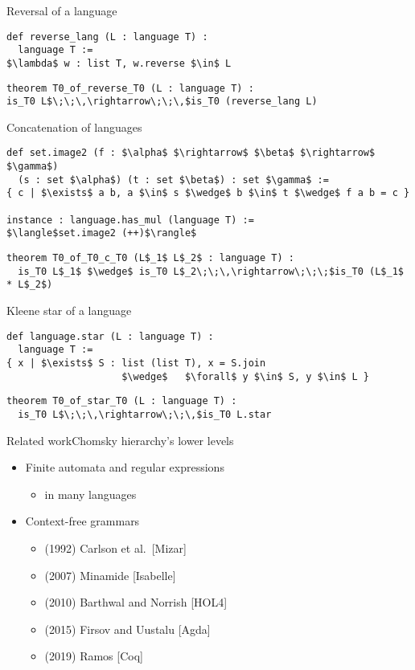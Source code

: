 \documentclass{beamer}
\begin{document}
	\begin{frame}[fragile]{Reversal of a language}
\begin{lstlisting}
def reverse_lang (L : language T) :
  language T :=
$\lambda$ w : list T, w.reverse $\in$ L
\end{lstlisting}
\pause
\begin{lstlisting}
theorem T0_of_reverse_T0 (L : language T) :
is_T0 L$\;\;\,\rightarrow\;\;\,$is_T0 (reverse_lang L)
\end{lstlisting}
	\end{frame}
	
	\begin{frame}[fragile]{Concatenation of languages}
\begin{lstlisting}
def set.image2 (f : $\alpha$ $\rightarrow$ $\beta$ $\rightarrow$ $\gamma$)
  (s : set $\alpha$) (t : set $\beta$) : set $\gamma$ :=
{ c | $\exists$ a b, a $\in$ s $\wedge$ b $\in$ t $\wedge$ f a b = c }

instance : language.has_mul (language T) :=
$\langle$set.image2 (++)$\rangle$
\end{lstlisting}
\pause
\begin{lstlisting}
theorem T0_of_T0_c_T0 (L$_1$ L$_2$ : language T) :
  is_T0 L$_1$ $\wedge$ is_T0 L$_2\;\;\,\rightarrow\;\;\;$is_T0 (L$_1$ * L$_2$)
\end{lstlisting}
	\end{frame}
	
	\begin{frame}[fragile]{Kleene star of a language}
\begin{lstlisting}
def language.star (L : language T) :
  language T :=
{ x | $\exists$ S : list (list T), x = S.join
                    $\wedge$   $\forall$ y $\in$ S, y $\in$ L }
\end{lstlisting}
\pause
\begin{lstlisting}
theorem T0_of_star_T0 (L : language T) :
  is_T0 L$\;\;\,\rightarrow\;\;\,$is_T0 L.star
\end{lstlisting}
	\end{frame}
	
	\begin{frame}{Related work}{Chomsky hierarchy's lower levels}
		\begin{itemize}
			\item Finite automata and regular expressions
			\begin{itemize}
				\item in many languages
			\end{itemize}
			\item Context-free grammars
			\begin{itemize}
				\item (1992) Carlson et al.\ [Mizar]
				\item (2007) Minamide [Isabelle]
				\item (2010) Barthwal and Norrish [HOL4]
				\item (2015) Firsov and Uustalu [Agda]
				\item (2019) Ramos [Coq]
			\end{itemize}
		\end{itemize}
	\end{frame}
	
\end{document}
